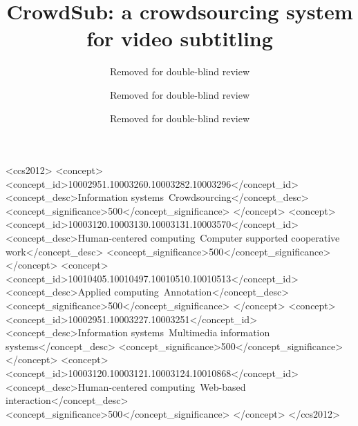 \documentclass[sigconf]{acmart}
\begin{document}
\title{CrowdSub: a crowdsourcing system for video subtitling}


\author{Removed for double-blind review}

\author{Removed for double-blind review}

\author{Removed for double-blind review}


\renewcommand{\shortauthors}{Removed for double-blind review}


\begin{abstract}
	
\end{abstract}

%
%
\begin{CCSXML}
<ccs2012>
<concept>
<concept_id>10002951.10003260.10003282.10003296</concept_id>
<concept_desc>Information systems~Crowdsourcing</concept_desc>
<concept_significance>500</concept_significance>
</concept>
<concept>
<concept_id>10003120.10003130.10003131.10003570</concept_id>
<concept_desc>Human-centered computing~Computer supported cooperative work</concept_desc>
<concept_significance>500</concept_significance>
</concept>
<concept>
<concept_id>10010405.10010497.10010510.10010513</concept_id>
<concept_desc>Applied computing~Annotation</concept_desc>
<concept_significance>500</concept_significance>
</concept>
<concept>
<concept_id>10002951.10003227.10003251</concept_id>
<concept_desc>Information systems~Multimedia information systems</concept_desc>
<concept_significance>500</concept_significance>
</concept>
<concept>
<concept_id>10003120.10003121.10003124.10010868</concept_id>
<concept_desc>Human-centered computing~Web-based interaction</concept_desc>
<concept_significance>500</concept_significance>
</concept>
</ccs2012>
\end{CCSXML}
\end{document}
